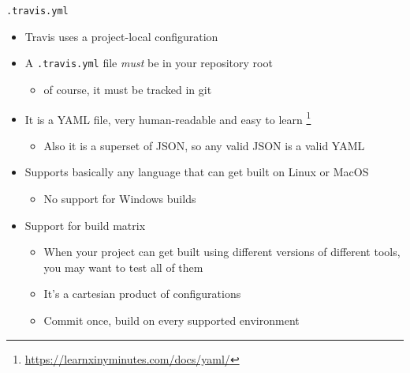 \documentclass[presentation]{beamer}
\begin{document}
\begin{frame}{\texttt{.travis.yml}}
    \begin{itemize}
        \item Travis uses a project-local configuration
        \item A \texttt{.travis.yml} file \textit{must} be in your repository root
        \begin{itemize}
            \item of course, it must be tracked in git
        \end{itemize}
        \item It is a YAML file, very human-readable and easy to learn \footnote{\url{https://learnxinyminutes.com/docs/yaml/}} 
        \begin{itemize}
            \item Also it is a superset of JSON, so any valid JSON is a valid YAML
        \end{itemize}
        \item Supports basically any language that can get built on Linux or MacOS
        \begin{itemize}
            \item No support for Windows builds
        \end{itemize}
        \item Support for build matrix
        \begin{itemize}
            \item When your project can get built using different versions of different tools, you may want to test all of them
            \item It's a cartesian product of configurations
            \item Commit once, build on every supported environment
        \end{itemize}
    \end{itemize}
\end{frame}
\end{document}
